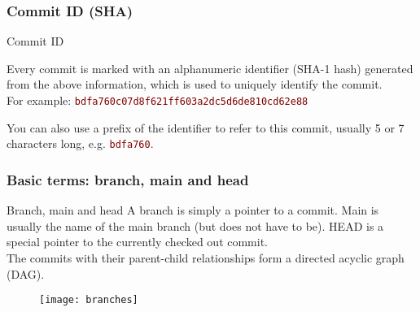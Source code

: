 \begin{frame}

\frametitle{Commit ID (SHA)}
\begin{block}{Commit ID}

	\smallskip Every commit is marked with an alphanumeric identifier (SHA-1 hash) generated from the above information, which is used to uniquely identify the commit. \\For example: \textcolor{Maroon}{\texttt{bdfa760c07d8f621ff603a2dc5d6de810cd62e88}}
\smallskip

You can also use a prefix of the identifier to refer to this commit, usually 5 or 7 characters long, e.g. \textcolor{Maroon}{\texttt{bdfa760}}.
\end{block}
\end{frame}


\begin{frame}

\frametitle{Basic terms: branch, main and head}

\begin{block}{Branch, main and head}
A \alert{branch} is simply a pointer to a commit. \alert{Main} is usually the name of the main branch (but does not have to be). \alert{HEAD} is a special pointer to the currently checked out commit. \\
\smallskip
The commits with their parent-child relationships form a directed acyclic graph (DAG).
\end{block}

\begin{figure}
\texttt{[image: branches]}
\end{figure}

\end{frame}


